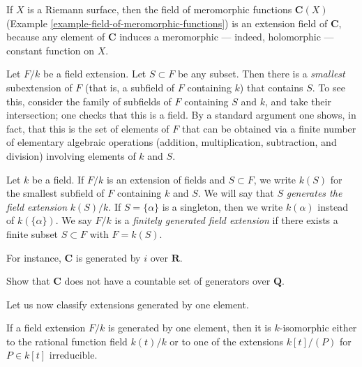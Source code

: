\begin{example}
\label{example-field-of-meromorphic-functions-extension-C}
If $X$ is a Riemann surface, then the field of meromorphic functions
$\mathbf{C}(X)$ (Example \ref{example-field-of-meromorphic-functions})
is an extension field of $\mathbf{C}$, because any element of $\mathbf{C}$
induces a meromorphic --- indeed, holomorphic --- constant function on $X$.
\end{example}

\noindent
Let $F/k$ be a field extension. Let $S \subset F$ be any subset.
Then there is a {\it smallest} subextension of $F$ (that is, a subfield of
$F$ containing $k$) that contains $S$. To see this, consider the family of
subfields of $F $ containing $S$ and $k$, and take their intersection; one
checks that this is a field. By a standard argument one shows, in fact, that
this is the set of elements of $F$ that can be obtained via a finite number
of elementary algebraic operations (addition, multiplication, subtraction,
and division) involving elements of $k$ and $S$.

\begin{definition}
\label{definition-generated-by}
Let $k$ be a field. If $F/k$ is an extension of fields and
$S \subset F$, we write $k(S)$ for the smallest subfield of $F$
containing $k$ and $S$. We will say that $S$ {\it generates the
field extension} $k(S)/k$. If $S = \{\alpha\}$ is a singleton, then we
write $k(\alpha)$ instead of $k(\{\alpha\})$. We say $F/k$ is a
{\it finitely generated field extension} if there exists a
finite subset $S \subset F$ with $F = k(S)$.
\end{definition}

\noindent
For instance, $\mathbf{C}$ is generated by $i$ over $\mathbf{R}$.

\begin{exercise}
\label{exercise-C-not-countably-generated}
Show that $\mathbf{C}$ does not have a countable set of generators over
$\mathbf{Q}$.
\end{exercise}

\noindent
Let us now classify extensions generated by one element.

\begin{lemma}
\label{lemma-field-extension-generated-by-one-element}
If a field extension $F/k$ is generated by one element, then it is
$k$-isomorphic either to the rational function field $k(t)/k$ or to one
of the extensions $k[t]/(P)$ for $P \in k[t]$ irreducible.
\end{lemma}

